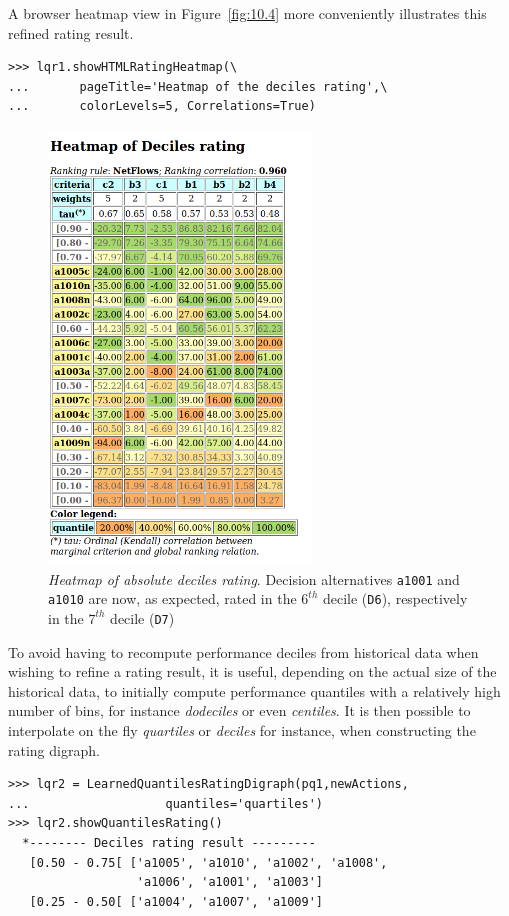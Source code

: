 A browser heatmap view in Figure~\vref{fig:10.4} more conveniently illustrates this refined rating result.
\begin{lstlisting}
>>> lqr1.showHTMLRatingHeatmap(\
...       pageTitle='Heatmap of the deciles rating',\
...       colorLevels=5, Correlations=True)
\end{lstlisting}
\begin{figure}[ht]
\sidecaption[t]
\includegraphics[width=7cm]{Figures/10-4-heatMap2.png}
\caption[Heatmap of absolute deciles rating]{\emph{Heatmap of absolute deciles rating}. Decision alternatives \texttt{a1001} and \texttt{a1010} are now, as expected, rated in the $6^{th}$ decile (\texttt{D6}), respectively in the $7^{th}$ decile (\texttt{D7})}
\label{fig:10.4}       %
\end{figure}

To avoid having to recompute performance deciles from historical data when wishing to refine a rating result, it is useful, depending on the actual size of the historical data, to initially compute performance quantiles with a relatively high number of bins, for instance \emph{dodeciles} or even \emph{centiles}. It is then possible to interpolate on the fly \emph{quartiles} or \emph{deciles} for instance, when constructing the rating digraph. 
\begin{lstlisting}[caption={From deciles interpolated quartiles rating result},label=list:10.10]
>>> lqr2 = LearnedQuantilesRatingDigraph(pq1,newActions,
...                   quantiles='quartiles')
>>> lqr2.showQuantilesRating()
  *-------- Deciles rating result ---------
   [0.50 - 0.75[ ['a1005', 'a1010', 'a1002', 'a1008',
                  'a1006', 'a1001', 'a1003']
   [0.25 - 0.50[ ['a1004', 'a1007', 'a1009']
\end{lstlisting}

